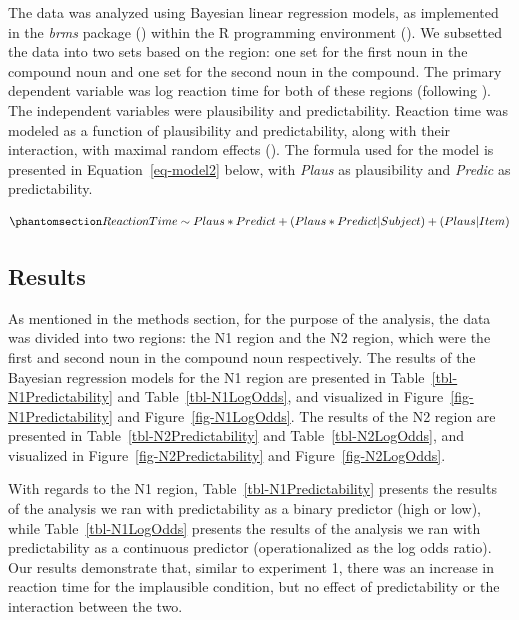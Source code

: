 \documentclass[
  12pt,
  letterpaper,
]{scrreport}
\begin{document}
The data was analyzed using Bayesian linear regression models, as
implemented in the \emph{brms} package
() within
the R programming environment (). We subsetted the data into two sets based on the region: one set
for the first noun in the compound noun and one set for the second noun
in the compound. The primary dependent variable was log reaction time
for both of these regions (following
). The
independent variables were plausibility and predictability. Reaction
time was modeled as a function of plausibility and predictability, along
with their interaction, with maximal random effects
(). The
formula used for the model is presented in Equation~\ref{eq-model2}
below, with \emph{Plaus} as plausibility and \emph{Predic} as
predictability.

\begin{equation}\phantomsection\label{eq-model2}{
Reaction Time\sim Plaus*Predict+(Plaus*Predict|Subject)+(Plaus|Item) 
}\end{equation}

\subsection{Results}\label{results-1}

As mentioned in the methods section, for the purpose of the analysis,
the data was divided into two regions: the N1 region and the N2 region,
which were the first and second noun in the compound noun respectively.
The results of the Bayesian regression models for the N1 region are
presented in Table~\ref{tbl-N1Predictability} and
Table~\ref{tbl-N1LogOdds}, and visualized in
Figure~\ref{fig-N1Predictability} and Figure~\ref{fig-N1LogOdds}. The
results of the N2 region are presented in
Table~\ref{tbl-N2Predictability} and Table~\ref{tbl-N2LogOdds}, and
visualized in Figure~\ref{fig-N2Predictability} and
Figure~\ref{fig-N2LogOdds}.

With regards to the N1 region, Table~\ref{tbl-N1Predictability} presents
the results of the analysis we ran with predictability as a binary
predictor (high or low), while Table~\ref{tbl-N1LogOdds} presents the
results of the analysis we ran with predictability as a continuous
predictor (operationalized as the log odds ratio). Our results
demonstrate that, similar to experiment 1, there was an increase in
reaction time for the implausible condition, but no effect of
predictability or the interaction between the two.
\end{document}
